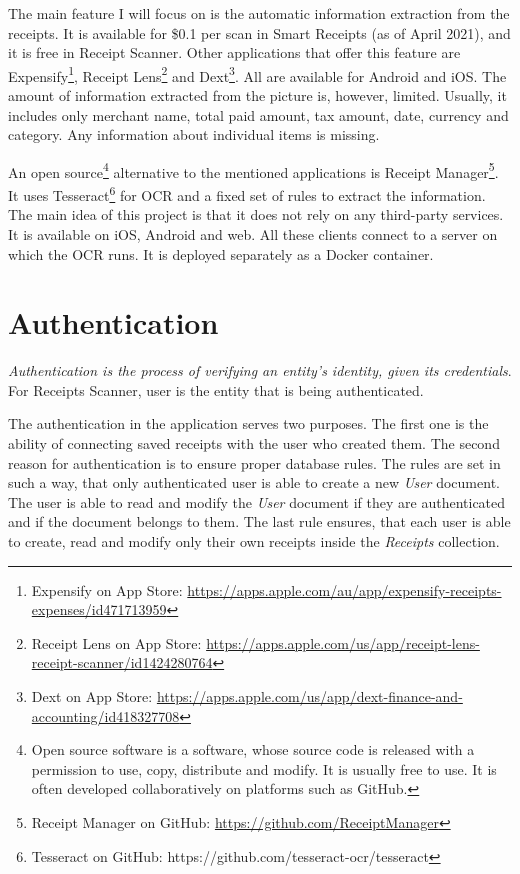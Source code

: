 \documentclass[
  digital, %
  table,   %
  oneside, %
  lof,     %
  lot,     %
]{fithesis3}
\begin{document}
The main feature I will focus on is the automatic information extraction from the receipts. It is available for \$0.1 per scan in Smart Receipts (as of April 2021), and it is free in Receipt Scanner. Other applications that offer this feature are Expensify\footnote{Expensify on App Store: \url{https://apps.apple.com/au/app/expensify-receipts-expenses/id471713959}}, Receipt Lens\footnote{Receipt Lens on App Store: \url{https://apps.apple.com/us/app/receipt-lens-receipt-scanner/id1424280764}} and Dext\footnote{Dext on App Store: \url{https://apps.apple.com/us/app/dext-finance-and-accounting/id418327708}}. All are available for Android and iOS. The amount of information extracted from the picture is, however, limited. Usually, it includes only merchant name, total paid amount, tax amount, date, currency and category. Any information about individual items is missing.

An open source\footnote{Open source software is a software, whose source code is released with a permission to use, copy, distribute and modify. It is usually free to use. It is often developed collaboratively on platforms such as GitHub.} alternative to the mentioned applications is Receipt Manager\footnote{Receipt Manager on GitHub: \url{https://github.com/ReceiptManager}}.
It uses Tesseract\footnote{Tesseract on GitHub: https://github.com/tesseract-ocr/tesseract} for OCR and a fixed set of rules to extract the information. 
The main idea of this project is that it does not rely on any third-party services. It is available on iOS, Android and web. All these clients connect to a server on which the OCR runs. It is deployed separately as a Docker container.

\chapter{Authentication}
\textit{Authentication is the process of verifying an entity’s identity, given its credentials}\cite{Cankaya2011}.
For Receipts Scanner, user is the entity that is being authenticated.

The authentication in the application serves two purposes. The first one is the ability of connecting saved receipts with the user who created them. The second reason for authentication is to ensure proper database rules. The rules are set in such a way, that only authenticated user is able to create a new \textit{User} document. The user is able to read and modify the \textit{User} document if they are authenticated and if the document belongs to them. The last rule ensures, that each user is able to create, read and modify only their own receipts inside the \textit{Receipts} collection.
\end{document}
